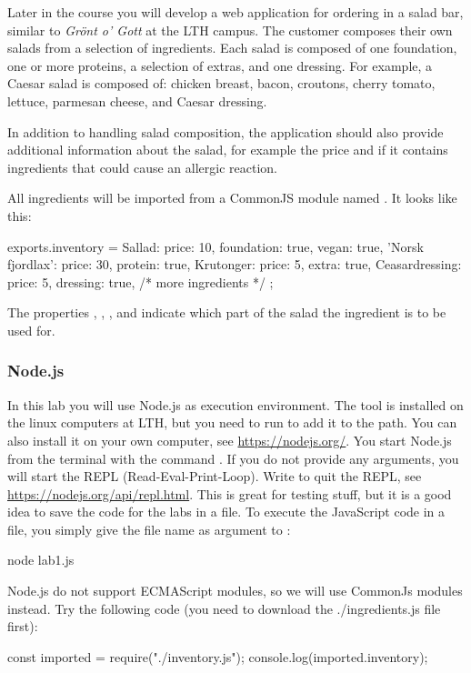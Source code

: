 \documentclass[fleqn, article, a4paper]{memoir}
\begin{document}
Later in the course you will develop a web application for ordering in a salad bar, similar to \emph{Grönt o' Gott} at the LTH campus. The customer composes their own salads from a selection of ingredients. Each salad is composed of one foundation, one or more proteins, a selection of extras, and one dressing. For example, a Caesar salad is composed of: chicken breast, bacon, croutons, cherry tomato, lettuce, parmesan cheese, and Caesar dressing.

In addition to handling salad composition, the application should also provide additional information about the salad, for example the price and if it contains ingredients that could cause an allergic reaction.

\noindent All ingredients will be imported from a CommonJS module named . It looks like this:
\begin{Code}
exports.inventory = {
  Sallad: {price: 10, foundation: true, vegan: true}, 
  'Norsk fjordlax': {price: 30, protein: true},
  Krutonger: {price: 5, extra: true},
  Ceasardressing: {price: 5, dressing: true},
  /* more ingredients */
};
\end{Code}
\noindent The properties , , , and  indicate which part of the salad the ingredient is to be used for.

\subsubsection*{Node.js}

In this lab you will use Node.js as execution environment. The tool is installed on the linux computers at LTH, but you need to run  to add it to the path. You can also install it on your own computer, see \url{https://nodejs.org/}. You start Node.js from the terminal with the command . If you do not provide any arguments, you will start the REPL (Read-Eval-Print-Loop). Write  to quit the REPL, see \url{https://nodejs.org/api/repl.html}. This is great for testing stuff, but it is a good idea to save the code for the labs in a file. To execute the JavaScript code in a file, you simply give the file name as argument to :
\begin{Code}
  node lab1.js
\end{Code}
 
\noindent Node.js do not support ECMAScript modules, so we will use CommonJs modules instead. Try the following code (you need to download the ./ingredients.js file first):
\begin{Code}
  const imported = require("./inventory.js");
  console.log(imported.inventory);
\end{Code}
\end{document}

